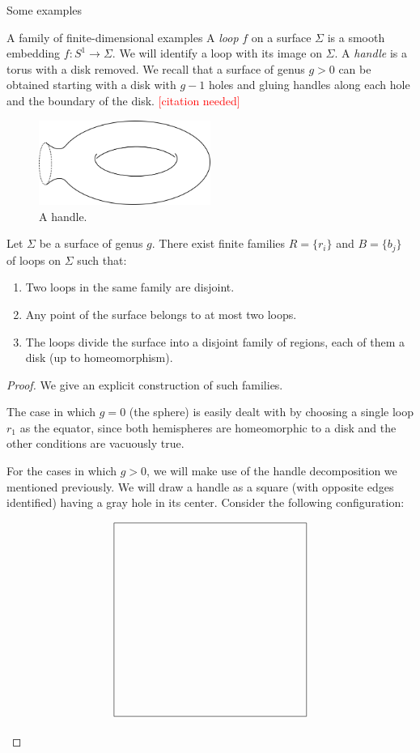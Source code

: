 \begin{chapter}{Some examples}
\begin{section}{A family of finite-dimensional examples}
A \emph{loop} $f$ on a surface $\Sigma$ is a smooth embedding $f:S^1\to \Sigma$. We will identify a loop with its image on $\Sigma$. A \emph{handle} is a torus with a disk removed. We recall that a surface of genus $g>0$ can be obtained starting with a disk with $g-1$ holes and gluing handles along each hole and the boundary of the disk. \textcolor{red}{[citation needed]}

\begin{figure}[h]
\centering
	\includegraphics[width=0.5\textwidth]{handle.png}
\caption{A handle.}
\end{figure}

\begin{prop}\label{surface-loops} Let $\Sigma$ be a surface of genus $g$. There exist finite families $R=\{r_i\}$ and $B=\{b_j\}$ of loops on $\Sigma$ such that:
\begin{enumerate}
\item Two loops in the same family are disjoint.
\item Any point of the surface belongs to at most two loops.
\item The loops divide the surface into a disjoint family of regions, each of them a disk (up to homeomorphism).
\end{enumerate}
\end{prop}

\begin{proof} We give an explicit construction of such families.

The case in which $g=0$ (the sphere) is easily dealt with by choosing a single loop $r_1$ as the equator, since both hemispheres are homeomorphic to a disk and the other conditions are vacuously true.

For the cases in which $g>0$, we will make use of the handle decomposition we mentioned previously. We will draw a handle as a square (with opposite edges identified) having a gray hole in its center. Consider the following configuration:

\begin{figure}[h]
\[
\begin{tikzpicture}
\draw (0,0) node[minimum size=6cm,draw] {};


\end{tikzpicture}\]
\end{figure}
\end{proof}
\end{section}
\end{chapter}
